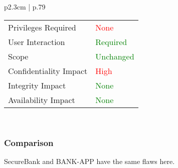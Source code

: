 \begin{longtable}{ p{2.3cm} | p{.79\linewidth} }
\begin{tabular}[t]{@{}l | l}
            Privileges Required     & \textcolor{red}{None} \\
            User Interaction        & \textcolor{Green}{Required} \\
            Scope                   & \textcolor{Green}{Unchanged} \\
            Confidentiality Impact  & \textcolor{red}{High} \\
            Integrity Impact        & \textcolor{Green}{None} \\
            Availability Impact     & \textcolor{Green}{None}
        \end{tabular} \\
   	\hline
\end{longtable}

\subsubsection{Comparison}
SecureBank and BANK-APP have the same flaws here.
\clearpage